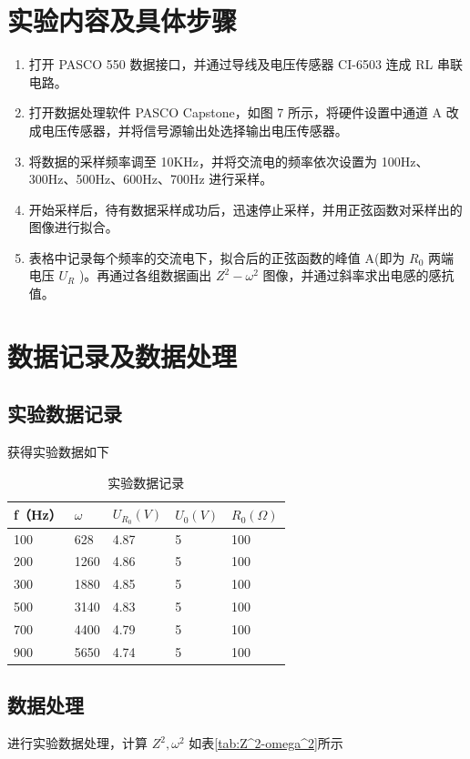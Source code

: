 \documentclass[a4paper]{../phyreport}
\begin{document}
\section{实验内容及具体步骤}
\begin{enumerate}
  \item 打开 PASCO 550 数据接口，并通过导线及电压传感器 CI-6503 连成 RL 串联电路。
  \item 打开数据处理软件 PASCO Capstone，如图 7 所示，将硬件设置中通道 A 改成电压传感器，并将信号源输出处选择输出电压传感器。
  \item 将数据的采样频率调至 10KHz，并将交流电的频率依次设置为 100Hz、300Hz、500Hz、600Hz、700Hz 进行采样。
  \item 开始采样后，待有数据采样成功后，迅速停止采样，并用正弦函数对采样出的图像进行拟合。
  \item 表格中记录每个频率的交流电下，拟合后的正弦函数的峰值 A(即为 $R_0$ 两端电压 $U_R$ )。再通过各组数据画出 $Z^2-\omega^2$ 图像，并通过斜率求出电感的感抗值。
\end{enumerate}

\longLine  
\section{数据记录及数据处理}
\subsection{实验数据记录}
获得实验数据如下
\begin{table}[H]
  \centering
  \caption{实验数据记录}
  \label{tab:实验数据记录}
  \begin{tabular}{lllll}\hline
  f（Hz） & $\omega$    & $U_{R_0}(V)$  & $U_0(V)$ & $R_0(\Omega)$  \\ \hline
  100   & 628  & 4.87 & 5  & 100 \\
  200   & 1260 & 4.86 & 5  & 100 \\
  300   & 1880 & 4.85 & 5  & 100 \\
  500   & 3140 & 4.83 & 5  & 100 \\
  700   & 4400 & 4.79 & 5  & 100 \\
  900   & 5650 & 4.74 & 5  & 100 \\\hline
  \end{tabular}
\end{table}
\subsection{数据处理}
进行实验数据处理，计算 $Z^2,\omega^2$ 如表\ref{tab:Z^2-omega^2}所示
\end{document}
